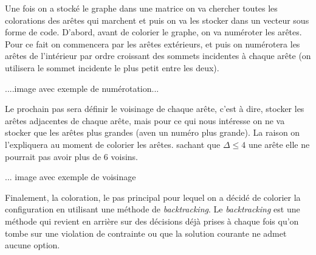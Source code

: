 \documentclass[10pt,a4paper]{article}
\begin{document}




Une fois on a stocké le graphe dans une matrice on va chercher toutes les colorations des arêtes qui marchent et puis on va les stocker dans un vecteur sous forme de code. D'abord, avant de colorier le graphe, on va numéroter les arêtes. Pour ce fait on commencera par les arêtes extérieurs, et puis on numérotera les arêtes de l'intérieur par ordre croissant des sommets incidentes à chaque arête (on utilisera le sommet incidente le plus petit entre les deux).

....image avec exemple de numérotation...

Le prochain pas sera définir le voisinage de chaque arête, c'est à dire, stocker les arêtes adjacentes de chaque arête, mais pour ce qui nous intéresse on ne va stocker que les arêtes plus grandes (aven un numéro plus grande). La raison on l'expliquera au moment de colorier les arêtes. sachant que $\Delta \leq 4$ une arête elle ne pourrait pas avoir plus de 6 voisins.

... image avec exemple de voisinage

Finalement, la coloration, le pas principal pour lequel on a décidé de colorier la configuration en utilisant une méthode de \emph{backtracking}. Le \emph{backtracking} est une méthode qui revient en arrière sur des décisions déjà prises à chaque fois qu'on tombe sur une violation de contrainte ou que la solution courante ne admet aucune option. 
\end{document}
